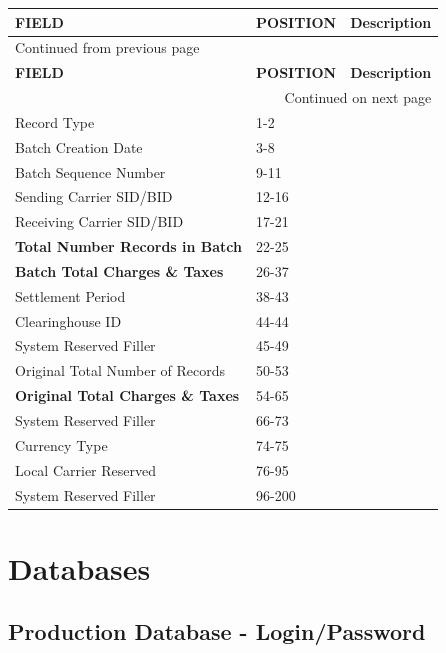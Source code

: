 \documentclass[12pt,twoside]{article}
\begin{document}
\begin{longtable}{l|l|l}
\hline
\textbf{FIELD} & \textbf{POSITION} & \textbf{Description}\\
\hline
\endfirsthead
\multicolumn{3}{l}{Continued from previous page} \\
\hline

\textbf{FIELD} & \textbf{POSITION} & \textbf{Description} \\

\hline
\endhead
\hline\multicolumn{3}{r}{Continued on next page} \\
\endfoot
\endlastfoot
\hline
Record Type & 1-2 & \\
Batch Creation Date & 3-8 & \\
Batch Sequence Number & 9-11 & \\
Sending Carrier SID/BID & 12-16 & \\
Receiving Carrier SID/BID & 17-21 & \\
\textbf{Total Number Records in Batch} & 22-25 & \\
\textbf{Batch Total Charges \& Taxes} & 26-37 & \\
Settlement Period & 38-43 & \\
Clearinghouse ID & 44-44 & \\
System Reserved Filler & 45-49 & \\
Original Total Number of Records & 50-53 & \\
\textbf{Original Total Charges \& Taxes} & 54-65 & \\
System Reserved Filler & 66-73 & \\
Currency Type & 74-75 & \\
Local Carrier Reserved & 76-95 & \\
System Reserved Filler & 96-200 & \\
\hline
\end{longtable}
\normalsize
\newpage
\section{Databases}
\label{sec:orgheadline68}
\subsection{Production Database - Login/Password}
\label{sec:orgheadline64}
\footnotesize
\end{document}
